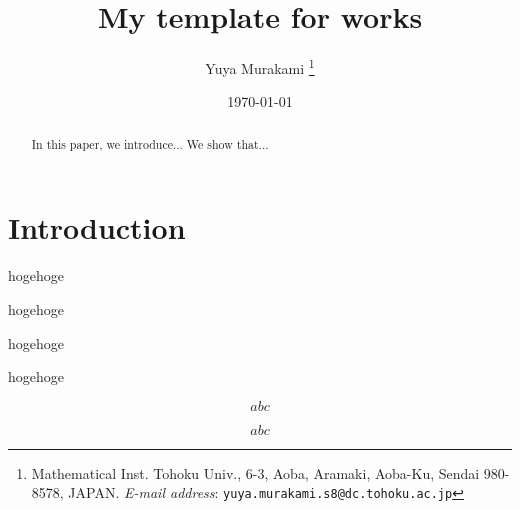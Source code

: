 \documentclass[11pt,a4paper,oneside,lualatex]{article}
\numberwithin{equation}{section} %
\begin{document}

\title{My template for works}
\author{Yuya Murakami
\thanks{Mathematical Inst. Tohoku Univ., 6-3, Aoba, Aramaki, Aoba-Ku, Sendai 980-8578, JAPAN.
	\textit{E-mail address}: \texttt{yuya.murakami.s8@dc.tohoku.ac.jp}}}
\date{\today}

\maketitle


\begin{abstract}
	In this paper, we introduce...
	We show that...
\end{abstract}


\tableofcontents


\section{Introduction} \label{sec:intro}


\begin{thm} \label{thm:main}
	hogehoge
\end{thm}

\begin{thm} \label{thm:main2}
	hogehoge
\end{thm}

\begin{thm} \label{thm:main3}
	hogehoge
\end{thm}

\begin{lem} \label{lem:1}
	hogehoge
\end{lem}

\begin{equation} \label{eq:1}
	abc
\end{equation}

\begin{equation} \label{eq:2}
	abc
\end{equation}
\end{document}
